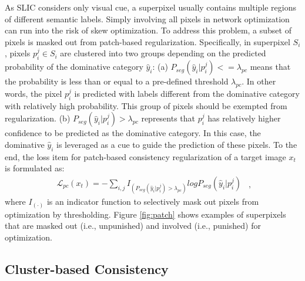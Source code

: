 \documentclass[10pt,twocolumn,letterpaper]{article}
\begin{document}
As SLIC considers only visual cue, a superpixel usually contains multiple regions of different semantic labels. Simply involving all pixels in network optimization can run into the risk of skew optimization. To address this problem, a subset of pixels is masked out from patch-based regularization.
Specifically, in superpixel $S_i$, pixels $p_i^j\in S_i$ are clustered into two groups depending on the predicted probability of the dominative category $\hat{y}_i$: (a) $P_{seg}(\hat{y}_i| p^j_i)<=\lambda_{pc}$ means that the probability is less than or equal to a pre-defined threshold $\lambda_{pc}$. In other words, the pixel $p_i^j$ is predicted with labels different from the dominative category with relatively high probability. This group of pixels should be exempted from regularization. (b) $P_{seg}(\hat{y}_i| p^j_i)>\lambda_{pc}$ represents that $p_i^j$ has relatively higher confidence to be predicted as the dominative category. In this case, the dominative $\hat{y}_i$ is leveraged as a cue to guide the prediction of these pixels. To the end, the loss item for patch-based consistency regularization of a target image $x_t$ is formulated as:
\begin{equation}\label{eq:pc}
\begin{aligned}
\mathcal{L}_{pc}(x_t)=- \sum_{i, j} I_{(P_{seg}(\hat{y}_i| p^j_i)>\lambda_{pc})} log P_{seg}(\hat{y}_i| p^j_i)
\end{aligned}~~,
\end{equation}
where $I_{(\cdot)}$ is an indicator function to selectively mask out pixels from optimization by thresholding. Figure \ref{fig:patch} shows examples of superpixels that are masked out (i.e., unpunished) and involved (i.e., punished) for optimization.


\subsection{Cluster-based Consistency}
\end{document}

